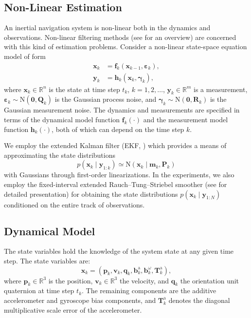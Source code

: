 \documentclass[conference]{ieeetran}
\newcommand{\R}{\mathbb{R}}
\newcommand{\N}{\mathrm{N}}
\newcommand{\mbf}[1]{\mathbf{#1}}
\newcommand{\vect}[1]{\mbf{#1}}
\newcommand{\vectb}[1]{\bm{#1}}
\begin{document}
\subsection{Non-Linear Estimation}
\label{sec:nonlin-estimation}
\noindent
An inertial navigation system is non-linear both in the dynamics and observations. Non-linear filtering methods (see \cite{Sarkka:2013} for an overview) are concerned with this kind of estimation problems. Consider a non-linear state-space equation model of form
\begin{align}
  \vect{x}_k &= \vect{f}_k(\vect{x}_{k-1}, \vectb{\varepsilon}_k), \label{eq:dynamic} \\
  \vect{y}_k &= \vect{h}_k(\vect{x}_k, \vectb{\gamma}_k), \label{eq:measurement} 
\end{align}
where $\vect{x}_k \in \R^n$ is the state at time step $t_k$, $k=1,2,\ldots$, $\vect{y}_k \in \R^m$ is a measurement, $\vectb{\varepsilon}_k \sim \N(\vectb{0}, \vect{Q}_k)$ is the Gaussian process noise, and  $\vectb{\gamma}_k \sim \N(\vectb{0},\vect{R}_k)$ is the Gaussian measurement noise. The dynamics and measurements are specified in terms of the dynamical model function $\vect{f}_k(\cdot)$ and the measurement model function $\vect{h}_k(\cdot)$, both of which can depend on the time step $k$.

We employ the extended Kalman filter (EKF, \cite{Bar-Shalom+Li+Kirubarajan:2001}) which provides a means of approximating the state distributions 
\begin{equation}
  p(\vect{x}_k \mid \vect{y}_{1:k}) \simeq \N(\vect{x}_k \mid \vect{m}_{k}, \vect{P}_{k})
\end{equation}
with Gaussians through first-order linearizations. In the experiments, we also employ the fixed-interval extended Rauch--Tung--Striebel smoother (see \cite{Sarkka:2013} for detailed presentation) for obtaining the state distributions $p(\vect{x}_k \mid \vect{y}_{1:N})$ conditioned on the entire track of observations.


\subsection{Dynamical Model}
\noindent
The state variables hold the knowledge of the system state at any given time step. The state variables are:
\begin{equation}
  \vect{x}_k = (\vect{p}_k, \vect{v}_k, \vect{q}_k, \vect{b}_k^\mathrm{a}, \vect{b}_k^{\omega}, \vect{T}_k^\mathrm{a}),
\end{equation}
where $\vect{p}_k \in \R^3$ is the position, $\vect{v}_k \in \R^3$ the velocity, and $\vect{q}_k$ the orientation unit quaternion at time step $t_k$. The remaining components are the additive accelerometer and gyroscope bias components, and $\vect{T}_k^\mathrm{a}$ denotes the diagonal multiplicative scale error of the accelerometer.
\end{document}

